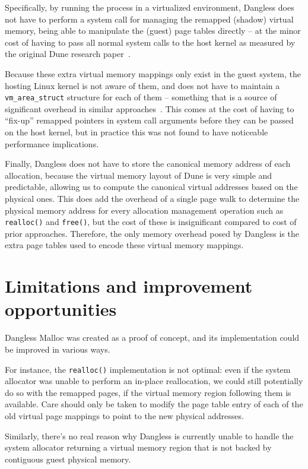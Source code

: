 Specifically, by running the process in a virtualized environment, Dangless does not have to perform a system call for managing the remapped (shadow) virtual memory, being able to manipulate the (guest) page tables directly -- at the minor cost of having to pass all normal system calls to the host kernel as measured by the original Dune research paper~\cite{dune-paper}.

Because these extra virtual memory mappings only exist in the guest system, the hosting Linux kernel is not aware of them, and does not have to maintain a \lstinline!vm_area_struct! structure for each of them -- something that is a source of significant overhead in similar approaches~\cite{oscar2017}. This comes at the cost of having to ``fix-up'' remapped pointers in system call arguments before they can be passed on the host kernel, but in practice this was not found to have noticeable performance implications.

Finally, Dangless does not have to store the canonical memory address of each allocation, because the virtual memory layout of Dune is very simple and predictable, allowing us to compute the canonical virtual addresses based on the physical ones. This does add the overhead of a single page walk to determine the physical memory address for every allocation management operation such as \lstinline!realloc()! and \lstinline!free()!, but the cost of these is insignificant compared to cost of prior approaches. Therefore, the only memory overhead posed by Dangless is the extra page tables used to encode these virtual memory mappings.

\section{Limitations and improvement opportunities}

Dangless Malloc was created as a proof of concept, and its implementation could be improved in various ways.

For instance, the \lstinline!realloc()! implementation is not optimal: even if the system allocator was unable to perform an in-place reallocation, we could still potentially do so with the remapped pages, if the virtual memory region following them is available. Care should only be taken to modify the page table entry of each of the old virtual page mappings to point to the new physical addresses.

Similarly, there's no real reason why Dangless is currently unable to handle the system allocator returning a virtual memory region that is not backed by contiguous guest physical memory.

